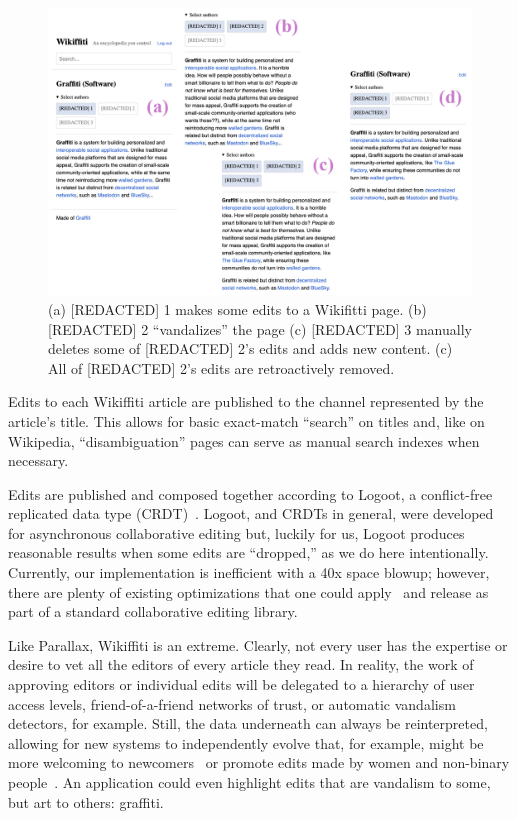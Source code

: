 \begin{figure}[htb]
    \centering
    \includegraphics[width=\textwidth]{paper/figures/wikiffiti.png}
    \caption{(a) [REDACTED] 1 makes some edits to a Wikifitti page. (b) [REDACTED] 2 ``vandalizes'' the page (c) [REDACTED] 3 manually deletes some of [REDACTED] 2's edits and adds new content. (c) All of [REDACTED] 2's edits are retroactively removed.
    }
    
    \label{case-studies:fig:wikiffiti}
\end{figure}

Edits to each Wikiffiti article are published to
the channel represented by the article's title.
This allows for basic exact-match ``search'' on titles and, like on Wikipedia,
``disambiguation'' pages can serve as manual search indexes when necessary.

Edits are published and composed together according to Logoot,
a conflict-free replicated data type (CRDT)~\cite{logoot,crdts}.
Logoot, and CRDTs in general, were developed for asynchronous collaborative editing
but, luckily for us, Logoot produces reasonable results when
some edits are ``dropped,'' as we do here intentionally.
Currently, our implementation is inefficient with a 40x space blowup;
however, there are plenty of existing optimizations that one could apply~\cite{logootbetter}
and release as part of a standard collaborative editing library.

Like Parallax, Wikiffiti is an extreme. Clearly, not every user
has the expertise or desire to vet all the editors of
every article they read. In reality, the work of approving editors
or individual edits will be delegated to
a hierarchy of user access levels,
friend-of-a-friend networks of trust,
or automatic vandalism detectors, for example.
Still, the data underneath can always be reinterpreted, allowing
for new systems to independently evolve that,
for example, might be more welcoming to newcomers~\cite{wikibourgeoisie, wikirisedecline}
or promote edits made by women and non-binary people~\cite{wikigender}.
An application could even highlight edits that are vandalism to some,
but art to others: graffiti.



